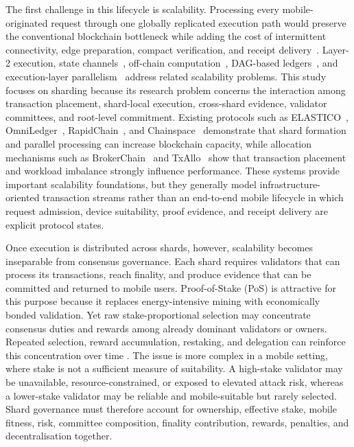 \documentclass[a4paper,fleqn]{cas-sc}
\begin{document}
The first challenge in this lifecycle is scalability. Processing every mobile-originated request through one globally replicated execution path would preserve the conventional blockchain bottleneck while adding the cost of intermittent connectivity, edge preparation, compact verification, and receipt delivery~\cite{Boughdiri2025,LIU2024,cortes2025impact,HEWA2021survey}. Layer-2 execution, state channels~\cite{Liu2025SharHSC,Negka2021StateChannels}, off-chain computation~\cite{Tan2025OffChain,Cai2022Offchain}, DAG-based ledgers~\cite{Wang2023DAG,Li2023DAG}, and execution-layer parallelism~\cite{Chen2023Parallel} address related scalability problems. This study focuses on sharding because its research problem concerns the interaction among transaction placement, shard-local execution, cross-shard evidence, validator committees, and root-level commitment. Existing protocols such as ELASTICO~\cite{Luu2016}, OmniLedger~\cite{Kokoris-Kogias2018}, RapidChain~\cite{Zamani2018a}, and Chainspace~\cite{Al-Bassam} demonstrate that shard formation and parallel processing can increase blockchain capacity, while allocation mechanisms such as BrokerChain~\cite{Huang2022Brokerchain} and TxAllo~\cite{Zhang2023TxAllo} show that transaction placement and workload imbalance strongly influence performance. These systems provide important scalability foundations, but they generally model infrastructure-oriented transaction streams rather than an end-to-end mobile lifecycle in which request admission, device suitability, proof evidence, and receipt delivery are explicit protocol states.

Once execution is distributed across shards, however, scalability becomes inseparable from consensus governance. Each shard requires validators that can process its transactions, reach finality, and produce evidence that can be committed and returned to mobile users. Proof-of-Stake (PoS) is attractive for this purpose because it replaces energy-intensive mining with economically bonded validation. Yet raw stake-proportional selection may concentrate consensus duties and rewards among already dominant validators
or owners. Repeated selection, reward accumulation, restaking, and delegation can reinforce this concentration over time
\cite{Li2023Rewarddistribution,LEPORATI2024,Tang2024,
Erdem2025Proof,Gersbach2026}. The issue is more complex in a mobile setting, where stake is not a sufficient measure of suitability. A high-stake validator may be unavailable, resource-constrained, or exposed to elevated attack risk, whereas a lower-stake validator may be reliable and mobile-suitable but rarely selected. Shard governance must therefore account for ownership, effective stake, mobile fitness, risk, committee composition, finality contribution, rewards, penalties, and decentralisation together.
\end{document}
